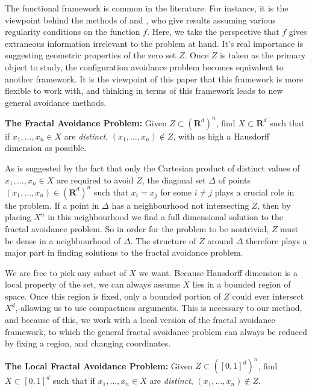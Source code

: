 \documentclass{article}
\theoremstyle{plain}
\theoremstyle{plain}
\begin{document}
The functional framework is common in the literature. For instance, it is the viewpoint behind the methods of \cite{MalabikaRob} and \cite{Mathe}, who give results assuming various regularity conditions on the function $f$. Here, we take the perspective that $f$ gives extraneous information irrelevant to the problem at hand. It's real importance is suggesting geometric properties of the zero set $Z$. Once $Z$ is taken as the primary object to study, the configuration avoidance problem becomes equivalent to another framework. It is the viewpoint of this paper that this framework is more flexible to work with, and thinking in terms of this framework leads to new general avoidance methods.

\begin{changemargin}{0.5em}{0em}
	{\bf The Fractal Avoidance Problem:} Given $Z \subset (\mathbf{R}^d)^n$, find $X \subset \mathbf{R}^d$ such that if $x_1, \dots, x_n \in X$ are {\it distinct}, $(x_1, \dots, x_n) \not \in Z$, with as high a Hausdorff dimension as possible.
\end{changemargin}

As is suggested by the fact that only the Cartesian product of distinct values of $x_1, \dots, x_n \in X$ are required to avoid $Z$, the diagonal set $\Delta$ of points $(x_1, \dots, x_n) \in (\mathbf{R}^d)^n$ such that $x_i = x_j$ for some $i \neq j$ plays a crucial role in the problem. If a point in $\Delta$ has a neighbourhood not intersecting $Z$, then by placing $X^n$ in this neighbourhood we find a full dimensional solution to the fractal avoidance problem. So in order for the problem to be nontrivial, $Z$ must be dense in a neighbourhood of $\Delta$. The structure of $Z$ around $\Delta$ therefore plays a major part in finding solutions to the fractal avoidance problem.

We are free to pick any subset of $X$ we want. Because Hausdorff dimension is a local property of the set, we can always assume $X$ lies in a bounded region of space. Once this region is fixed, only a bounded portion of $Z$ could ever intersect $X^d$, allowing us to use compactness arguments. This is necessary to our method, and because of this, we work with a local version of the fractal avoidance framework, to which the general fractal avoidance problem can always be reduced by fixing a region, and changing coordinates.

\begin{changemargin}{0.5em}{0em}
	{\bf The Local Fractal Avoidance Problem:} Given $Z \subset ([0,1]^d)^n$, find $X \subset [0,1]^d$ such that if $x_1, \dots, x_n \in X$ are {\it distinct}, $(x_1, \dots, x_n) \not \in Z$.
\end{changemargin}
\end{document}

